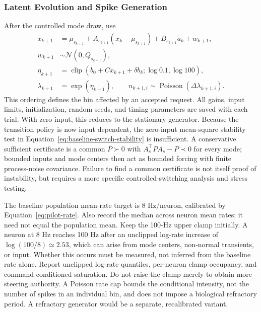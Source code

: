 \subsubsection{Latent Evolution and Spike Generation}
After the controlled mode draw, use
\begin{align}
 x_{k+1}&=\mu_{s_{k+1}}+A_{s_{k+1}}(x_k-\mu_{s_{k+1}})
          +B_{s_{k+1}}\tilde a_k+w_{k+1},\\
 w_{k+1}&\sim\mathcal N(0,Q_{s_{k+1}}),\\
 \eta_{k+1}&=\operatorname{clip}
   (b_0+Cx_{k+1}+\delta b_k;\log 0.1,\log100),\\
 \lambda_{k+1}&=\exp(\eta_{k+1}),\qquad
 n_{k+1,i}\sim\operatorname{Poisson}(\Delta\lambda_{k+1,i}).
 \label{eq:controlled-spikes}
\end{align}
This ordering defines the bin affected by an accepted request. All gains, input limits, initialization, random seeds, and timing parameters are saved with each trial. With zero input, this reduces to the stationary generator. Because the transition policy is now input dependent, the zero-input mean-square stability test in Equation~\eqref{eq:baseline-switch-stability} is insufficient. A conservative sufficient certificate is a common $P\succ0$ with $A_s^{\top}PA_s-P\prec0$ for every mode; bounded inputs and mode centers then act as bounded forcing with finite process-noise covariance. Failure to find a common certificate is not itself proof of instability, but requires a more specific controlled-switching analysis and stress testing.

The baseline population mean-rate target is 8 Hz/neuron, calibrated by Equation~\eqref{eq:pilot-rate}. Also record the median across neuron mean rates; it need not equal the population mean. Keep the 100-Hz upper clamp initially. A neuron at 8 Hz reaches 100 Hz after an unclipped log-rate increase of $\log(100/8)\simeq2.53$, which can arise from mode centers, non-normal transients, or input. Whether this occurs must be measured, not inferred from the baseline rate alone. Report unclipped log-rate quantiles, per-neuron clamp occupancy, and command-conditioned saturation. Do not raise the clamp merely to obtain more steering authority. A Poisson rate cap bounds the conditional intensity, not the number of spikes in an individual bin, and does not impose a biological refractory period. A refractory generator would be a separate, recalibrated variant.

